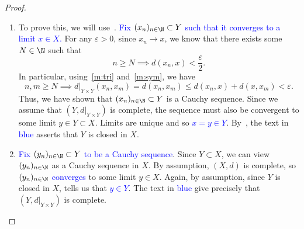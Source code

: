 \begin{proof}
\begin{enumerate}
	\item To prove this, we will use~. \textcolor{blue}{Fix $(x_n)_{n\in\N}\subset Y$ such that it converges to a limit $x\in X$.} For any $\varepsilon>0$, since $x_n\to x$, we know that there exists some $N\in\N$ such that
	\[
	n\ge N \implies d(x_n,x)<\frac{\varepsilon}{2}.
	\]
	In particular, using~\ref{m:tri} and~\ref{m:sym}, we have
	\[
	n,m\ge N \implies d|_{Y\times Y}(x_n,x_m) = d(x_n,x_m) \le d(x_n,x) + d(x,x_m) < \varepsilon.
	\]
	Thus, we have shown that $(x_n)_{n\in\N}\subset Y$ is a Cauchy sequence. Since we assume that $(Y,d|_{Y\times Y})$ is complete, the sequence must also be convergent to some limit $y\in Y\subset X$. Limits are unique and so \textcolor{blue}{$x= y\in Y$}. By~, the text in \textcolor{blue}{blue} asserts that $Y$ is closed in $X$.
	\item \textcolor{blue}{Fix $(y_n)_{n\in\N}\subset Y$ to be a Cauchy sequence}. Since $Y\subset X$, we can view $(y_n)_{n\in\N}$ as a Cauchy sequence in $X$. By assumption, $(X,d)$ is complete, so \textcolor{blue}{$(y_n)_{n\in\N}$ converges} to some limit $y\in X$. Again, by assumption, since $Y$ is closed in $X$,  tells us that \textcolor{blue}{$y\in Y$}. The text in \textcolor{blue}{blue} give precisely that $(Y,d|_{Y\times Y})$ is complete.
\end{enumerate}
\end{proof}
